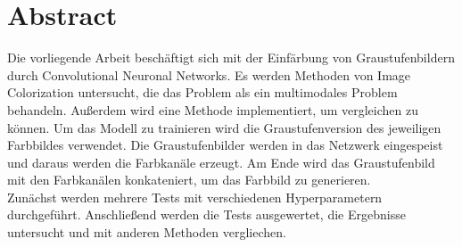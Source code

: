 \chapter*{Abstract}
Die vorliegende Arbeit beschäftigt sich mit der Einfärbung von Graustufenbildern durch Convolutional Neuronal Networks.
Es werden Methoden von Image Colorization untersucht, die das Problem als ein multimodales Problem behandeln. Außerdem wird
eine Methode implementiert, um vergleichen zu können. Um das Modell zu trainieren wird die Graustufenversion des jeweiligen Farbbildes verwendet.
Die Graustufenbilder werden in das Netzwerk eingespeist und daraus werden die
Farbkanäle erzeugt. Am Ende wird das Graustufenbild mit den Farbkanälen konkateniert, um das Farbbild zu generieren.
\\
Zunächst werden mehrere Tests mit verschiedenen Hyperparametern durchgeführt.
Anschließend werden die Tests ausgewertet, die Ergebnisse untersucht und mit anderen Methoden vergliechen.